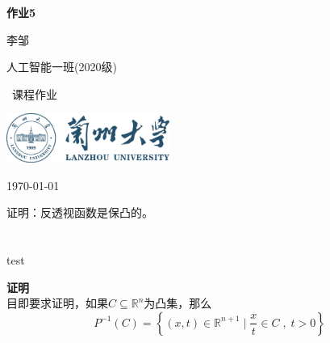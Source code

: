 \documentclass[10pt, a4paper]{article}
\newenvironment{Solution}{\textbf{证明}\\}
\newcommand\course{最优化方法}                         %
\begin{document}
\begin{titlepage}
    \begin{center}
        \vspace*{3.5cm}
            
        \Huge
        \textbf{作业5}
            
        \vspace{2cm}
        \LARGE
        李邹
            
        \vspace{0.1cm}
        \Large
        人工智能一班(2020级)                      %
        
            
        \vfill
        
        \course \ 课程作业
            
        \vspace{1cm}
            
        \includegraphics[width=0.4\textwidth]{lzu-logo.png}
        \\
        
        \Large
        
        \today
            
    \end{center}
\end{titlepage}


\newpage
\begin{Problem}
证明：反透视函数是保凸的。
\\\\\\
test
\end{Problem}
    
\begin{Solution}

\end{Solution}
    

题目即要求证明，如果$C\subseteq \mathbb{R} ^{n} $为凸集，那么\[P^{-1} (C)=\left \{ (x,t)\in \mathbb{R}^{n+1}\mid \frac{x}{t}\in C\;,\;t>0 \right \} \]
\end{document}
